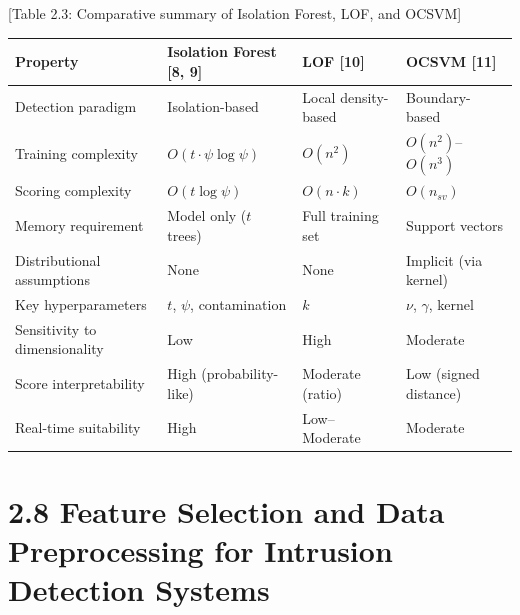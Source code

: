 \documentclass[
  a4paper]{report}
\newcounter{none} %
\begin{document}
{[}Table 2.3: Comparative summary of Isolation Forest, LOF, and OCSVM{]}

{\def\LTcaptype{none} %
\begin{longtable}[]{@{}
  >{\raggedright\arraybackslash}p{}
  >{\raggedright\arraybackslash}p{}
  >{\raggedright\arraybackslash}p{}
  >{\raggedright\arraybackslash}p{}@{}}
\toprule\noalign{}
\begin{minipage}[b]{\linewidth}\raggedright
Property
\end{minipage} & \begin{minipage}[b]{\linewidth}\raggedright
Isolation Forest {[}8, 9{]}
\end{minipage} & \begin{minipage}[b]{\linewidth}\raggedright
LOF {[}10{]}
\end{minipage} & \begin{minipage}[b]{\linewidth}\raggedright
OCSVM {[}11{]}
\end{minipage} \\
\midrule\noalign{}
\endhead
\bottomrule\noalign{}
\endlastfoot
Detection paradigm & Isolation-based & Local density-based &
Boundary-based \\
Training complexity & \(O(t \cdot \psi \log \psi)\) & \(O(n^2)\) &
\(O(n^2)\)--\(O(n^3)\) \\
Scoring complexity & \(O(t \log \psi)\) & \(O(n \cdot k)\) &
\(O(n_{sv})\) \\
Memory requirement & Model only (\(t\) trees) & Full training set &
Support vectors \\
Distributional assumptions & None & None & Implicit (via kernel) \\
Key hyperparameters & \(t\), \(\psi\), contamination & \(k\) & \(\nu\),
\(\gamma\), kernel \\
Sensitivity to dimensionality & Low & High & Moderate \\
Score interpretability & High (probability-like) & Moderate (ratio) &
Low (signed distance) \\
Real-time suitability & High & Low--Moderate & Moderate \\
\end{longtable}
}

\section{2.8 Feature Selection and Data Preprocessing for Intrusion
Detection
Systems}\label{feature-selection-and-data-preprocessing-for-intrusion-detection-systems}
\end{document}
